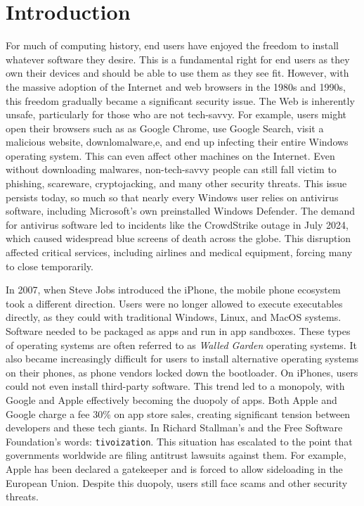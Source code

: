 \section{Introduction}
\label{sec:intro}

For much of computing history, end users have enjoyed the freedom to install whatever software they desire. This is a fundamental right for end users as they own their devices and should be able to use them as they see fit. However, with the massive adoption of the Internet and web browsers in the 1980s and 1990s, this freedom gradually became a significant security issue. The Web is inherently unsafe, particularly for those who are not tech-savvy. For example, users might open their browsers such as as Google Chrome, use Google Search, visit a malicious website, downlomalware,e, and end up infecting their entire Windows operating system\cite{microsoftPreventMalware}. This can even affect other machines on the Internet. Even without downloading malwares, non-tech-savvy people can still fall victim to phishing\cite{microsoftPhishingTrends}, scareware, cryptojacking, and many other security threats. This issue persists today, so much so that nearly every Windows user relies on antivirus software, including Microsoft's own preinstalled Windows Defender. The demand for antivirus software led to incidents like the CrowdStrike outage in July 2024, which caused widespread blue screens of death across the globe. This disruption affected critical services, including airlines and medical equipment, forcing many to close temporarily\cite{wikipedia2024crowdstrike}.

In 2007, when Steve Jobs introduced the iPhone, the mobile phone ecosystem took a different direction. Users were no longer allowed to execute executables directly, as they could with traditional Windows, Linux, and MacOS systems. Software needed to be packaged as apps and run in app sandboxes. These types of operating systems are often referred to as \textit{Walled Garden} operating systems. It also became increasingly difficult for users to install alternative operating systems on their phones, as phone vendors locked down the bootloader\cite{melontini2025bootloader}. On iPhones, users could not even install third-party software\cite{apple2021trusted}. This trend led to a monopoly, with Google and Apple effectively becoming the duopoly of apps. Both Apple and Google charge a fee 30\% on app store sales, creating significant tension between developers and these tech giants\cite{FreeBSDfan2024, haney2023users}. In Richard Stallman's and the Free Software Foundation's words: \texttt{tivoization}\cite{GNUtivoization}.  This situation has escalated to the point that governments worldwide are filing antitrust lawsuits against them\cite{usdoj2024apple,europa2024apple,samr2025google}. For example, Apple has been declared a gatekeeper and is forced to allow sideloading in the European Union\cite{europa2024apple}. Despite this duopoly, users still face scams and other security threats\cite{10.1145/3548606.3560615, 10.1145/2484313.2484316}.

